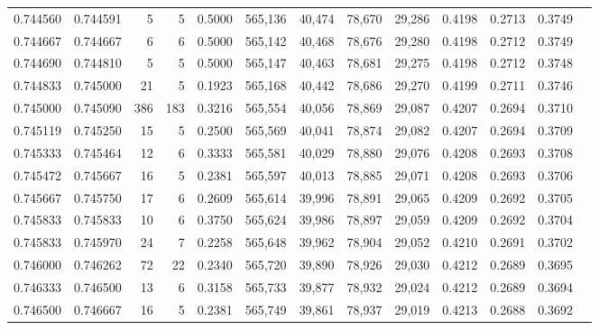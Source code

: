 \begin{tabular}{rrrrrrrrrrrrr}
0.744560 & 0.744591 &     5 &   5 &                                     0.5000 & 565,136 &  40,474 &  78,670 &  29,286 & 0.4198 & 0.2713 & 0.3749 \\
0.744667 & 0.744667 &     6 &   6 &                                     0.5000 & 565,142 &  40,468 &  78,676 &  29,280 & 0.4198 & 0.2712 & 0.3749 \\
0.744690 & 0.744810 &     5 &   5 &                                     0.5000 & 565,147 &  40,463 &  78,681 &  29,275 & 0.4198 & 0.2712 & 0.3748 \\
0.744833 & 0.745000 &    21 &   5 &                                     0.1923 & 565,168 &  40,442 &  78,686 &  29,270 & 0.4199 & 0.2711 & 0.3746 \\
0.745000 & 0.745090 &   386 & 183 &                                     0.3216 & 565,554 &  40,056 &  78,869 &  29,087 & 0.4207 & 0.2694 & 0.3710 \\
0.745119 & 0.745250 &    15 &   5 &                                     0.2500 & 565,569 &  40,041 &  78,874 &  29,082 & 0.4207 & 0.2694 & 0.3709 \\
0.745333 & 0.745464 &    12 &   6 &                                     0.3333 & 565,581 &  40,029 &  78,880 &  29,076 & 0.4208 & 0.2693 & 0.3708 \\
0.745472 & 0.745667 &    16 &   5 &                                     0.2381 & 565,597 &  40,013 &  78,885 &  29,071 & 0.4208 & 0.2693 & 0.3706 \\
0.745667 & 0.745750 &    17 &   6 &                                     0.2609 & 565,614 &  39,996 &  78,891 &  29,065 & 0.4209 & 0.2692 & 0.3705 \\
0.745833 & 0.745833 &    10 &   6 &                                     0.3750 & 565,624 &  39,986 &  78,897 &  29,059 & 0.4209 & 0.2692 & 0.3704 \\
0.745833 & 0.745970 &    24 &   7 &                                     0.2258 & 565,648 &  39,962 &  78,904 &  29,052 & 0.4210 & 0.2691 & 0.3702 \\
0.746000 & 0.746262 &    72 &  22 &                                     0.2340 & 565,720 &  39,890 &  78,926 &  29,030 & 0.4212 & 0.2689 & 0.3695 \\
0.746333 & 0.746500 &    13 &   6 &                                     0.3158 & 565,733 &  39,877 &  78,932 &  29,024 & 0.4212 & 0.2689 & 0.3694 \\
0.746500 & 0.746667 &    16 &   5 &                                     0.2381 & 565,749 &  39,861 &  78,937 &  29,019 & 0.4213 & 0.2688 & 0.3692 \\

\end{tabular}
